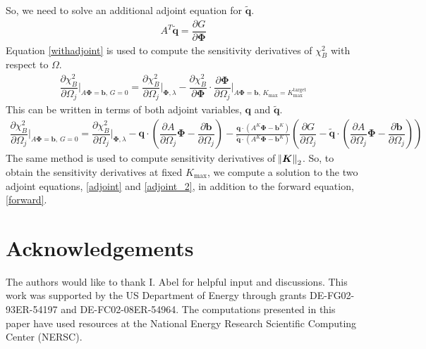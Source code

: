 \documentclass[aps,unsortedaddress]{revtex4-1}
\newcommand{\partder}[2]{\dfrac{\partial  #1}{\partial  #2}}
\begin{document}
So, we need to solve an additional adjoint equation for $\tilde{\bm{q}}$.
\begin{gather}
A^T \tilde{\bm{q}} = \partder{G}{\bm{\Phi}}
\label{adjoint_2}
\end{gather}
Equation \ref{withadjoint} is used to compute the sensitivity derivatives of $\chi^2_B$ with respect to $\Omega$.
\begin{gather}
\partder{\chi^2_B}{\Omega_j} \bigg \rvert_{A \bm{\Phi} = \bm{b}, \, G = 0} = \partder{\chi^2_B}{\Omega_j} \bigg \rvert_{\bm{\Phi}, \lambda} - \partder{\chi^2_B}{\bm{\Phi}} \cdot \partder{\bm{\Phi}}{\Omega_j} \bigg \rvert_{A \bm{\Phi} = \bm{b}, \, K_{\text{max}} = K_{\text{max}}^{\text{target}}}
\end{gather}
This can be written in terms of both adjoint variables, $\bm{q}$ and $\tilde{\bm{q}}$. 
\begin{multline}
\partder{\chi^2_B}{\Omega_j} \bigg \rvert_{A \bm{\Phi} = \bm{b}, \, G = 0} = \partder{\chi^2_B}{\Omega_j} \bigg \rvert_{\bm{\Phi}, \lambda} - \bm{q} \cdot \left( \partder{A}{\Omega_j} \bm{\Phi} - \partder{\bm{b}}{\Omega_j} \right) - \frac{ \bm{q} \cdot \left(A^K \bm{\Phi} - \bm{b}^K \right)}{  \tilde{\bm{q}} \cdot \left( A^K \bm{\Phi} - \bm{b}^K \right) } \left( \partder{G}{\Omega_j} - \tilde{\bm{q}} \cdot \left( \partder{A}{\Omega_j} \bm{\Phi} - \partder{\bm{b}}{\Omega_j} \right) \right)
\end{multline}
The same method is used to compute sensitivity derivatives of $\norm{\bm{K}}_2$. So, to obtain the sensitivity derivatives at fixed $K_{\text{max}}$, we compute a solution to the two adjoint equations, \ref{adjoint} and \ref{adjoint_2}, in addition to the forward equation, \ref{forward}.

\section*{Acknowledgements}
The authors would like to thank I. Abel for helpful input and discussions. This work was supported by the US Department of Energy through grants DE-FG02-93ER-54197 and DE-FC02-08ER-54964. The computations presented in this paper have used resources at the National Energy Research Scientific Computing Center (NERSC). 

\raggedright


\end{document}

